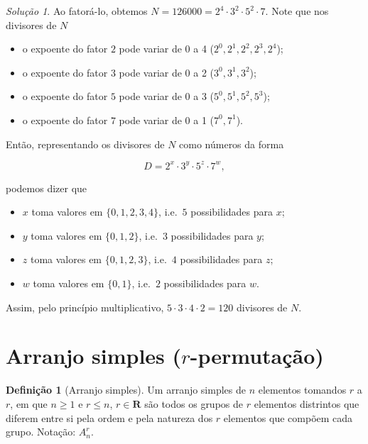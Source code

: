 \documentclass[]{book}
\providecommand{\tightlist}{%
  \setlength{\itemsep}{0pt}\setlength{\parskip}{0pt}}
\theoremstyle{definition}
\newtheorem{definition}{Definição}[chapter]
\theoremstyle{definition}
\theoremstyle{definition}
\theoremstyle{remark}
\newtheorem*{solution}{Solução}
\begin{document}
\begin{solution}
\iffalse{} {Solução. } \fi{}Ao fatorá-lo, obtemos \(N=126000=2^4\cdot 3^2\cdot 5^2\cdot 7\).
Note que nos divisores de \(N\)

\begin{itemize}
\tightlist
\item
  o expoente do fator \(2\) pode variar de 0 a 4 (\(2^0, 2^1, 2^2, 2^3, 2^4\));
\item
  o expoente do fator \(3\) pode variar de 0 a 2 (\(3^0, 3^1, 3^2\));
\item
  o expoente do fator \(5\) pode variar de 0 a 3 (\(5^0, 5^1, 5^2, 5^3\));
\item
  o expoente do fator \(7\) pode variar de 0 a 1 (\(7^0, 7^1\)).
\end{itemize}

Então, representando os divisores de \(N\) como números da forma

\[D = 2^x\cdot 3^y\cdot 5^z\cdot 7^w,\]

podemos dizer que

\begin{itemize}
\tightlist
\item
  \(x\) toma valores em \(\{0,1,2,3,4\}\), i.e.~\(5\) possibilidades para \(x\);
\item
  \(y\) toma valores em \(\{0,1,2\}\), i.e.~\(3\) possibilidades para \(y\);
\item
  \(z\) toma valores em \(\{0,1,2,3\}\), i.e.~\(4\) possibilidades para \(z\);
\item
  \(w\) toma valores em \(\{0,1\}\), i.e.~\(2\) possibilidades para \(w\).
\end{itemize}

Assim, pelo princípio multiplicativo, \(5\cdot 3\cdot 4\cdot 2 = 120\) divisores de \(N\).
\end{solution}

\hypertarget{arranjo-simples-r-permutauxe7uxe3o}{%
\section{\texorpdfstring{Arranjo simples (\(r\)-permutação)}{Arranjo simples (r-permutação)}}\label{arranjo-simples-r-permutauxe7uxe3o}}

\begin{definition}[Arranjo simples]
\protect\hypertarget{def:defArranjo}{}{\label{def:defArranjo} \iffalse (Arranjo simples) \fi{} }Um arranjo simples de \(n\) elementos tomandos \(r\) a \(r\), em que \(n \geq 1\) e \(r \leq n\), \(r \in \mathbf{R}\) são todos os grupos de \(r\) elementos distrintos que diferem entre si pela ordem e pela natureza dos \(r\) elementos que compõem cada grupo.
Notação: \(A^{r}_{n}\).
\end{definition}
\end{document}
